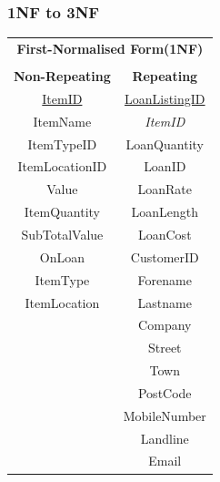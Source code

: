 \newpage

\subsubsection{1NF to 3NF}

\begin{center}
    \begin{tabular}{|c|c|}
        \hline
        \multicolumn{2}{|c|}{\textbf{First-Normalised Form(1NF)}} \\
        \multicolumn{2}{|c|}{ }                                   \\ \hline
        \textbf{Non-Repeating} & \textbf{Repeating}               \\ \hline
        \underline{ItemID}     & \underline{LoanListingID}        \\ 
        ItemName               & \emph{ItemID}                    \\ 
        ItemTypeID             & LoanQuantity                     \\ 
        ItemLocationID         & LoanID                           \\
        Value                  & LoanRate                         \\ 
        ItemQuantity           & LoanLength                       \\ 
        SubTotalValue          & LoanCost                         \\ 
        OnLoan                 & CustomerID                       \\ 
        ItemType               & Forename                         \\ 
        ItemLocation           & Lastname                         \\ 
                               & Company                          \\ 
                               & Street                           \\ 
                               & Town                             \\ 
                               & PostCode                         \\ 
                               & MobileNumber                     \\ 
                               & Landline                         \\ 
                               & Email                            \\ 

\end{tabular}
\end{center}
